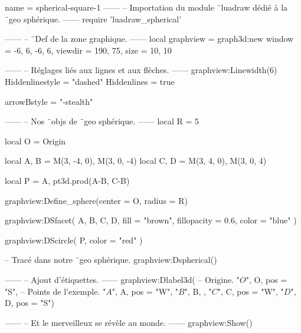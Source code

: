 \documentclass{standalone}
\begin{document}
\begin{luadraw}{name = spherical-square-1}
------
-- Importation du module ¨luadraw dédié à la ¨geo sphérique.
------
require 'luadraw_spherical'

------
-- ¨Def de la zone graphique.
------
local graphview = graph3d:new{
  window  = {-6, 6, -6, 6},
  viewdir = {190, 75},
  size    = {10, 10}
}

------
-- Réglages liés aux lignes et aux flèches.
------
graphview:Linewidth(6)
Hiddenlinestyle = "dashed"
Hiddenlines     = true

arrowBstyle = "-stealth"

------
-- Nos ¨objs de ¨geo sphérique.
------
local R =  5

local O = Origin

local A, B = M(3, -4, 0), M(3, 0, -4)
local C, D = M(3, 4, 0), M(3, 0, 4)

local P = {A, pt3d.prod(A-B, C-B)}

graphview:Define_sphere({center = O, radius = R})

graphview:DSfacet(
  {A, B, C, D},
  {fill = "brown", fillopacity = 0.6, color = "blue"}
)

graphview:DScircle(
  P,
  {color = "red"}
)

-- Tracé dans notre ¨geo sphérique.
graphview:Dspherical()

------
-- Ajout d'étiquettes.
------
graphview:Dlabel3d(
-- Origine.
  "$O$", O, {pos = "S"},
-- Points de l'exemple.
  "$A$", A, {pos = "W"},
  "$B$", B, {},
  "$C$", C, {pos = "W"},
  "$D$", D, {pos = "S"})

------
-- Et le merveilleux se révèle au monde.
------
graphview:Show()
\end{luadraw}
\end{document}

